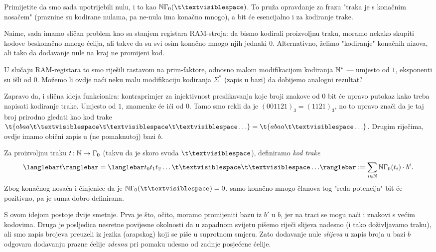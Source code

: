 Primijetite da smo sada upotrijebili nulu, i to kao $\N\Gamma_0(\bl)$. To pruža opravdanje za frazu "traka je s konačnim nosačem" (praznine su kodirane nulama, pa ne-nula ima konačno mnogo), a bit će esencijalno i za kodiranje trake.

Naime, sada imamo sličan problem kao sa stanjem registara RAM-stroja: da bismo kodirali proizvoljnu traku, moramo nekako skupiti kodove beskonačno mnogo ćelija, ali takve da su svi osim konačno mnogo njih jednaki $0$. Alternativno, želimo "kodiranje" konačnih nizova, ali tako da dodavanje nule na kraj ne promijeni kod.

U slučaju RAM-registara to smo riješili rastavom na prim-faktore, odnosno malom modifikacijom kodiranja ${\mathbb N}^*$ --- umjesto od $1$, eksponenti su išli od $0$. Možemo li ovdje naći neku malu modifikaciju kodiranja $\Sigma^*$ (zapis u bazi) da dobijemo analogni rezultat?

Zapravo da, i slična ideja funkcionira: kontraprimjer za injektivnost preslikavanja koje broji znakove od $0$ bit će upravo putokaz kako treba napisati kodiranje trake. Umjesto od $1$, znamenke će ići od $0$. Tamo smo rekli da je $(001121)_3=(1121)_3$, no to upravo znači da je taj broj prirodno gledati kao kod trake $\t{abaa\bl\bl\bl\ldots}=\t{abaa\bl\ldots}$. Drugim riječima, ovdje imamo obični zapis u (ne pomaknutoj) bazi $b$.

\begin{definicija}
Za proizvoljnu traku $t\colon{\mathbb N}\to\Gamma_0$ (takvu da je skoro svuda $\bl$), definiramo \emph{kod trake} \begin{equation}
    \knk{t}=\knk{t_0t_1t_2\ldots\bl\bl\ldots}:=\sum_{i\in\N}\N\Gamma_0(t_i)\cdot b^i\text.
\end{equation}
Zbog konačnog nosača i činjenice da je $\N\Gamma_0(\bl)=0$, samo konačno mnogo članova tog "reda potencija" bit će pozitivno, pa je suma dobro definirana.
\end{definicija}

S ovom idejom postoje dvije smetnje. Prva je što, očito, moramo promijeniti bazu iz $b'$ u $b$, jer na traci se mogu naći i znakovi s većim kodovima. Druga je posljedica nesretne povijesne okolnosti da u zapadnom svijetu pišemo riječi slijeva nadesno (i tako doživljavamo traku), ali smo zapis brojeva preuzeli iz jezika (arapskog) koji se piše u suprotnom smjeru. Zato dodavanje nule \emph{slijeva} u zapis broja u bazi $b$ odgovara dodavanju prazne ćelije \emph{zdesna} pri pomaku udesno od zadnje posjećene ćelije.

